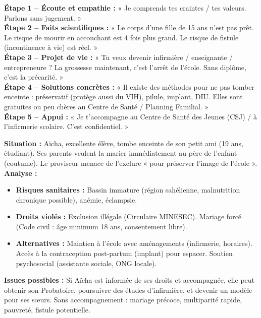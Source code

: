 \documentclass[11pt]{article}
\begin{document}
\begin{methode}
\textbf{Étape 1 -- Écoute et empathie :} « Je comprends tes craintes / tes valeurs. Parlons sans jugement. »\\
\textbf{Étape 2 -- Faits scientifiques :} « Le corps d'une fille de 15 ans n'est pas prêt. Le risque de mourir en accouchant est 4 fois plus grand. Le risque de fistule (incontinence à vie) est réel. »\\
\textbf{Étape 3 -- Projet de vie :} « Tu veux devenir infirmière / enseignante / entrepreneure ? La grossesse maintenant, c'est l'arrêt de l'école. Sans diplôme, c'est la précarité. »\\
\textbf{Étape 4 -- Solutions concrètes :} « Il existe des méthodes pour ne pas tomber enceinte : préservatif (protège aussi du VIH), pilule, implant, DIU. Elles sont gratuites ou peu chères au Centre de Santé / Planning Familial. »\\
\textbf{Étape 5 -- Appui :} « Je t'accompagne au Centre de Santé des Jeunes (CSJ) / à l'infirmerie scolaire. C'est confidentiel. »
\end{methode}

\begin{exemplebox}
\textbf{Situation :} Aïcha, excellente élève, tombe enceinte de son petit ami (19 ans, étudiant). Ses parents veulent la marier immédiatement au père de l'enfant (coutume). Le proviseur menace de l'exclure « pour préserver l'image de l'école ».
\textbf{Analyse :}
\begin{itemize}
    \item \textbf{Risques sanitaires :} Bassin immature (région sahélienne, malnutrition chronique possible), anémie, éclampsie.
    \item \textbf{Droits violés :} Exclusion illégale (Circulaire MINESEC). Mariage forcé (Code civil : âge minimum 18 ans, consentement libre).
    \item \textbf{Alternatives :} Maintien à l'école avec aménagements (infirmerie, horaires). Accès à la contraception post-partum (implant) pour espacer. Soutien psychosocial (assistante sociale, ONG locale).
\end{itemize}
\textbf{Issues possibles :} Si Aïcha est informée de ses droits et accompagnée, elle peut obtenir son Probatoire, poursuivre des études d'infirmière, et devenir un modèle pour ses sœurs. Sans accompagnement : mariage précoce, multiparité rapide, pauvreté, fistule potentielle.
\end{exemplebox}
\end{document}
